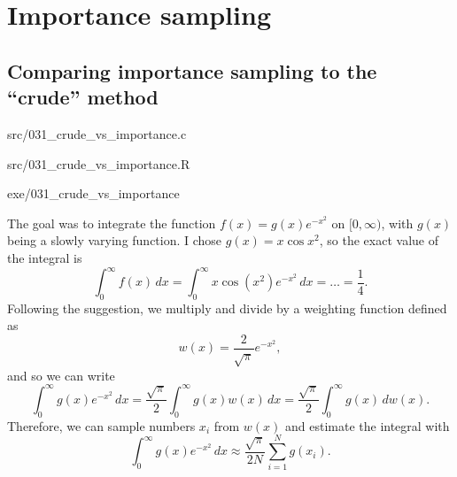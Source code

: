 \chapter{Importance sampling}

\section{Comparing importance sampling to the \enquote{crude} method}%
\label{ex:031}

\begin{sourcefiles}
  \item[Source code] src/031\_crude\_vs\_importance.c
  \item[Analysis script] src/031\_crude\_vs\_importance.R
  \item[Executable] exe/031\_crude\_vs\_importance
\end{sourcefiles}

The goal was to integrate the function $f(x) = g(x) e^{-x^{2}}$ on $[0,
\infty)$, with $g(x)$ being a slowly varying function. I chose $g(x) = x
\cos x^{2}$, so the exact value of the integral is
\begin{equation}
  \int_{0}^{\infty} f(x) \, dx = \int_{0}^{\infty} x \cos(x^2) e^{-x^{2}}\, dx =
  \dots = \frac{1}{4}.
\end{equation}
Following the suggestion, we multiply and divide by a weighting function defined
as
\begin{equation}
  w(x) = \frac{2}{\sqrt{\pi}} e^{-x^{2}},
\end{equation}
and so we can write
\begin{equation}
  \int_{0}^{\infty} g(x) e^{-x^{2}} \, dx = \frac{\sqrt{\pi}}{2}
  \int_{0}^{\infty} g(x) w(x) \, dx = \frac{\sqrt{\pi}}{2} \int_{0}^{\infty}
  g(x) \, dw(x).
\end{equation}
Therefore, we can sample numbers $x_i$ from $w(x)$ and estimate the integral
with
\begin{equation}
  \int_{0}^{\infty} g(x) e^{-x^{2}} \, dx \approx \frac{\sqrt{\pi}}{2N} \sum_{i
  = 1}^{N} g(x_i).
\end{equation}

